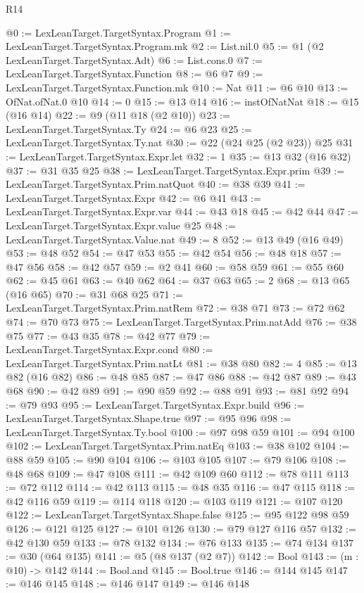 \begin{lexlean}{R14}
\begin{coremodule}
@0 := LexLeanTarget.TargetSyntax.Program
@1 := LexLeanTarget.TargetSyntax.Program.mk
@2 := List.nil.{0}
@5 := @1 (@2 LexLeanTarget.TargetSyntax.Adt)
@6 := List.cons.{0}
@7 := LexLeanTarget.TargetSyntax.Function
@8 := @6 @7
@9 := LexLeanTarget.TargetSyntax.Function.mk
@10 := Nat
@11 := @6 @10
@13 := OfNat.ofNat.{0} @10
@14 := 0
@15 := @13 @14
@16 := instOfNatNat
@18 := @15 (@16 @14)
@22 := @9 (@11 @18 (@2 @10))
@23 := LexLeanTarget.TargetSyntax.Ty
@24 := @6 @23
@25 := LexLeanTarget.TargetSyntax.Ty.nat
@30 := @22 (@24 @25 (@2 @23)) @25
@31 := LexLeanTarget.TargetSyntax.Expr.let
@32 := 1
@35 := @13 @32 (@16 @32)
@37 := @31 @35 @25
@38 := LexLeanTarget.TargetSyntax.Expr.prim
@39 := LexLeanTarget.TargetSyntax.Prim.natQuot
@40 := @38 @39
@41 := LexLeanTarget.TargetSyntax.Expr
@42 := @6 @41
@43 := LexLeanTarget.TargetSyntax.Expr.var
@44 := @43 @18
@45 := @42 @44
@47 := LexLeanTarget.TargetSyntax.Expr.value @25
@48 := LexLeanTarget.TargetSyntax.Value.nat
@49 := 8
@52 := @13 @49 (@16 @49)
@53 := @48 @52
@54 := @47 @53
@55 := @42 @54
@56 := @48 @18
@57 := @47 @56
@58 := @42 @57
@59 := @2 @41
@60 := @58 @59
@61 := @55 @60
@62 := @45 @61
@63 := @40 @62
@64 := @37 @63
@65 := 2
@68 := @13 @65 (@16 @65)
@70 := @31 @68 @25
@71 := LexLeanTarget.TargetSyntax.Prim.natRem
@72 := @38 @71
@73 := @72 @62
@74 := @70 @73
@75 := LexLeanTarget.TargetSyntax.Prim.natAdd
@76 := @38 @75
@77 := @43 @35
@78 := @42 @77
@79 := LexLeanTarget.TargetSyntax.Expr.cond
@80 := LexLeanTarget.TargetSyntax.Prim.natLt
@81 := @38 @80
@82 := 4
@85 := @13 @82 (@16 @82)
@86 := @48 @85
@87 := @47 @86
@88 := @42 @87
@89 := @43 @68
@90 := @42 @89
@91 := @90 @59
@92 := @88 @91
@93 := @81 @92
@94 := @79 @93
@95 := LexLeanTarget.TargetSyntax.Expr.build
@96 := LexLeanTarget.TargetSyntax.Shape.true
@97 := @95 @96
@98 := LexLeanTarget.TargetSyntax.Ty.bool
@100 := @97 @98 @59
@101 := @94 @100
@102 := LexLeanTarget.TargetSyntax.Prim.natEq
@103 := @38 @102
@104 := @88 @59
@105 := @90 @104
@106 := @103 @105
@107 := @79 @106
@108 := @48 @68
@109 := @47 @108
@111 := @42 @109 @60
@112 := @78 @111
@113 := @72 @112
@114 := @42 @113
@115 := @48 @35
@116 := @47 @115
@118 := @42 @116 @59
@119 := @114 @118
@120 := @103 @119
@121 := @107 @120
@122 := LexLeanTarget.TargetSyntax.Shape.false
@125 := @95 @122 @98 @59
@126 := @121 @125
@127 := @101 @126
@130 := @79 @127 @116 @57
@132 := @42 @130 @59
@133 := @78 @132
@134 := @76 @133
@135 := @74 @134
@137 := @30 (@64 @135)
@141 := @5 (@8 @137 (@2 @7))
@142 := Bool
@143 := (m : @10) -> @142
@144 := Bool.and
@145 := Bool.true
@146 := @144 @145
@147 := @146 @145
@148 := @146 @147
@149 := @146 @148

\end{coremodule}
\end{lexlean}

